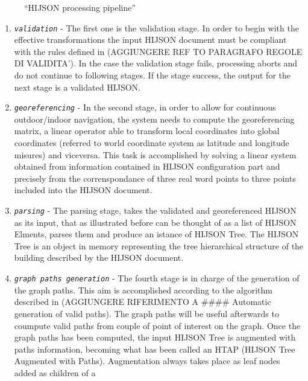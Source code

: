 \documentclass{sig-alternate}
\begin{document}
\begin{figure}[!htbp]
\centering
{}
\caption{``HIJSON processing pipeline''}
\label{fig:pipeline}
\end{figure}

\begin{enumerate}
\def\labelenumi{\arabic{enumi}.}
\itemsep1pt\parskip0pt
\item
  \textit{\texttt{validation}} - The first one is the validation stage. In
  order to begin with the effective transformations the input HIJSON
  document must be compliant with the rules defined in (AGGIUNGERE REF
  TO PARAGRAFO REGOLE DI VALIDITA'). In the case the validation stage
  fails, processing aborts and do not continue to following stages. If
  the stage success, the output for the next stage is a validated
  HIJSON.
\item
  \textit{\texttt{georeferencing}} - In the second stage, in order to allow
  for continuous outdoor/indoor navigation, the system needs to compute
  the georeferencing matrix, a linear operator able to transform local
  coordinates into global coordinates (referred to world coordinate
  system as latitude and longitude misures) and viceversa. This task is
  accomplished by solving a linear system obtained from information
  contained in HIJSON configuration part and precisely from the
  correnspondance of three real word points to three points included
  into the HIJSON document.
\item
  \textit{\texttt{parsing}} - The parsing stage, takes the validated and
  georeferenced HIJSON as its input, that as illustrated before can be
  thought of as a list of HIJSON Elments, parses them and produce an
  istance of HIJSON Tree. The HIJSON Tree is an object in memory
  representing the tree hierarchical structure of the building described
  by the HIJSON document.
\item
  \textit{\texttt{graph paths generation}} - The fourth stage is in charge
  of the generation of the graph paths. This aim is accomplished
  according to the algorithm described in (AGGIUNGERE RIFERIMENTO A
  \#\#\#\# Automatic generation of valid paths). The graph paths will be
  useful afterwards to coumpute valid paths from couple of point of
  interest on the graph. Once the graph paths has been computed, the
  input HIJSON Tree is augmented with paths information, becoming what
  has been called an HTAP (HIJSON Tree Augmented with Paths).
  Augmentation always takes place as leaf nodes added as children of a

\end{enumerate}
\end{document}
